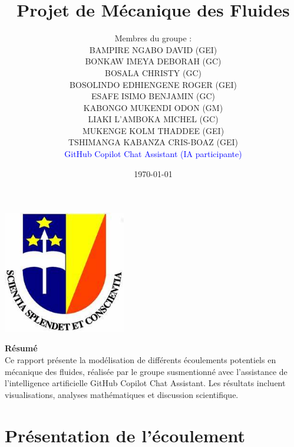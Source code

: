 \documentclass[12pt,a4paper]{article}
\title{\textbf{Projet de Mécanique des Fluides}}
\author{Membres du groupe :\\
BAMPIRE NGABO DAVID (GEI)\\
BONKAW IMEYA DEBORAH (GC)\\
BOSALA CHRISTY (GC)\\
BOSOLINDO EDHIENGENE ROGER (GEI)\\
ESAFE ISIMO BENJAMIN (GC)\\
KABONGO MUKENDI ODON (GM)\\
LIAKI L'AMBOKA MICHEL (GC)\\
MUKENGE KOLM THADDEE (GEI)\\
TSHIMANGA KABANZA CRIS-BOAZ (GEI)\\[0.5cm]
\textcolor{blue}{GitHub Copilot Chat Assistant (IA participante)}}
\date{\today}
\begin{document}
\maketitle
\thispagestyle{empty}
\vspace{1cm}
\begin{center}
\includegraphics[width=0.4\textwidth]{unikin.jpg}
\end{center}
\vfill
\begin{center}
{\Large \textbf{Résumé}}\\[0.3cm]
Ce rapport présente la modélisation de différents écoulements potentiels en mécanique des fluides, réalisée par le groupe susmentionné avec l’assistance de l’intelligence artificielle GitHub Copilot Chat Assistant. Les résultats incluent visualisations, analyses mathématiques et discussion scientifique.
\end{center}
\newpage
\tableofcontents
\listoffigures
\newpage
\section{Présentation de l'écoulement}
\end{document}
